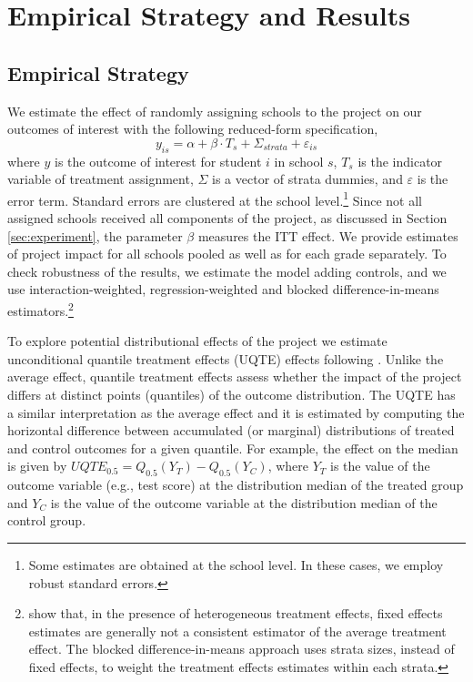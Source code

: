 \documentclass[11pt,a4paper]{article}
\begin{document}

\section{Empirical Strategy and Results} \label{sec:methodology_results}
\subsection{Empirical Strategy} \label{sec:methodology}

We estimate the effect of randomly assigning schools to the project on our outcomes of interest with the following reduced-form specification,
\begin{equation} \label{eq:OLS}
    y_{is} = \alpha + \beta \cdot T_{s} + \Sigma_{strata} + \varepsilon_{is}
\end{equation}
where $y$ is the outcome of interest for student $i$ in school $s$, $T_s$ is the indicator variable of treatment assignment, $\Sigma$ is a vector of strata dummies, and $\varepsilon$ is the error term. Standard errors are clustered at the school level.\footnote{Some estimates are obtained at the school level. In these cases, we employ robust standard errors.} Since not all assigned schools received all components of the project, as discussed in Section \ref{sec:experiment}, the parameter $\beta$ measures the ITT effect. We provide estimates of project impact for all schools pooled as well as for each grade separately. To check robustness of the results, we estimate the model adding controls, and we use interaction-weighted, regression-weighted and blocked difference-in-means estimators.\footnote{\cite{gibbons2018broken} show that, in the presence of heterogeneous treatment effects, fixed effects estimates are generally not a consistent estimator of the average treatment effect. The blocked difference-in-means approach uses strata sizes, instead of fixed effects, to weight the treatment effects estimates within each strata.}

To explore potential distributional effects of the project we estimate unconditional quantile treatment effects (UQTE) effects following \cite{firpo2009unconditional}. Unlike the average effect, quantile treatment effects assess whether the impact of the project differs at distinct points (quantiles) of the outcome distribution. The UQTE has a similar interpretation as the average effect and it is estimated by computing the horizontal difference between accumulated (or marginal) distributions of treated and control outcomes for a given quantile. For example, the effect on the median is given by $UQTE_{0.5} = Q_{0.5}(Y_{T}) - Q_{0.5}(Y_{C})$, where $Y_{T}$ is the value of the outcome variable (e.g., test score) at the distribution median of the treated group and $Y_{C}$ is the value of the outcome variable at the distribution median of the control group.
\end{document}
